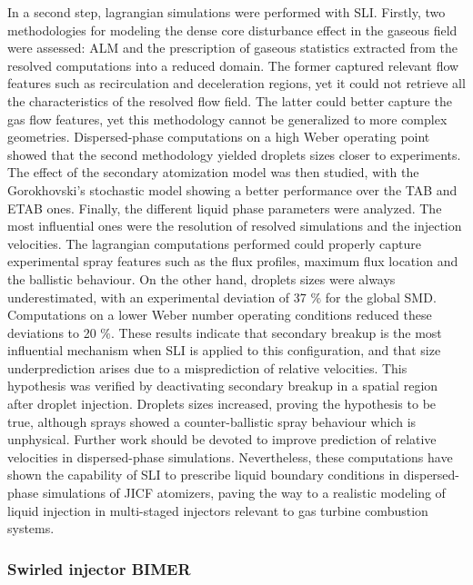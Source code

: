 In a second step, lagrangian simulations were performed with SLI. Firstly, two methodologies for modeling the dense core disturbance effect in the gaseous field were assessed: ALM and the prescription of gaseous statistics extracted from the resolved computations into a reduced domain. The former captured relevant flow features such as recirculation and deceleration regions, yet it could not retrieve all the characteristics of the resolved flow field. The latter could better capture the gas flow features, yet this methodology cannot be generalized to more complex geometries. Dispersed-phase computations on a high Weber operating point showed that the second methodology yielded droplets sizes closer to experiments. The effect of the secondary atomization model was then studied, with the Gorokhovski’s stochastic model showing a better performance over the TAB and ETAB ones. Finally, the different liquid phase parameters were analyzed. The most influential ones were the resolution of resolved simulations and the injection velocities. The lagrangian computations performed could properly capture experimental spray features such as the flux profiles, maximum flux location and the ballistic behaviour. On the other hand, droplets sizes were always underestimated, with an
experimental deviation of 37 $\%$ for the global SMD. Computations on a lower Weber number operating conditions reduced these deviations to 20 $\%$. These results indicate that secondary breakup is the most influential mechanism when SLI is applied to this configuration, and that size underprediction arises due to a misprediction of relative velocities. This hypothesis was verified by deactivating secondary breakup in a spatial region after droplet injection. Droplets sizes increased, proving the hypothesis to be true, although sprays showed a counter-ballistic spray behaviour which is unphysical. Further work should be devoted to improve prediction of relative velocities in dispersed-phase simulations. Nevertheless, these computations have shown the capability of SLI to prescribe liquid boundary conditions in dispersed-phase simulations of JICF atomizers, paving the way to a realistic modeling of liquid injection in multi-staged injectors relevant to gas turbine combustion systems.


\subsubsection*{Swirled injector BIMER}


